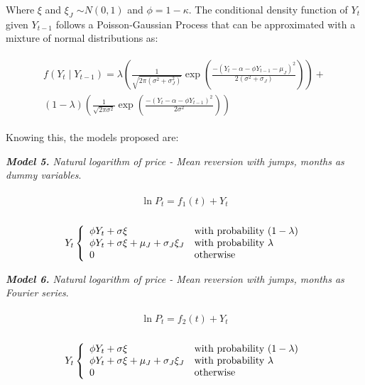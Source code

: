 \documentclass[3p]{elsarticle}
\begin{document}
Where $\xi$ and $\xi_J$ $\sim N(0,1)$ and $\phi=1-\kappa$. The conditional density function of $Y_t$ given $Y_{t-1}$ follows a Poisson-Gaussian Process that can be approximated \citep{Escribano2011} with a mixture of normal distributions as:

\begin{align}
\label{eq:like}
\begin{split}
f(Y_t\mid Y_{t-1})=\lambda\left ( \frac{1}{\sqrt{2\pi( \sigma^2+\sigma_J^2)}} \exp\left ( \frac{-(Y_t-\alpha-\phi Y_{t-1}-\mu_J)^2}{2(\sigma^2+\sigma_J)} \right )\right )+\\
(1-\lambda)\left ( \frac{1}{\sqrt{2\pi\sigma^2}} \exp\left ( \frac{-(Y_t-\alpha-\phi Y_{t-1})^2}{2\sigma^2} \right )\right )
\end{split}
\end{align}

Knowing this, the models proposed are:

\textit{\textbf{Model 5.} Natural logarithm of price - Mean reversion with jumps, months as dummy variables}.

\begin{align}
\label{eq:m4}
\begin{split}
\ln P_t=f_1(t)+Y_t\\
\end{split}
\end{align}

\[Y_t\left\{
\begin{array}{ll}
    \phi Y_t+\sigma\xi & \textup{with probability } (1-\lambda) \\
      \phi Y_t+\sigma\xi+\mu_J+\sigma_J\xi_J & \textup{with probability } \lambda \\
      0 & \textup{otherwise} \\
\end{array} 
\right. \]


\textit{\textbf{Model 6.} Natural logarithm of price - Mean reversion with jumps, months as Fourier series}.

\begin{align}
\label{eq:m4}
\begin{split}
\ln P_t=f_2(t)+Y_t\\
\end{split}
\end{align}

\[Y_t\left\{
\begin{array}{ll}
    \phi Y_t+\sigma\xi & \textup{with probability } (1-\lambda) \\
      \phi Y_t+\sigma\xi+\mu_J+\sigma_J\xi_J & \textup{with probability } \lambda \\
      0 & \textup{otherwise} \\
\end{array} 
\right. \]
\end{document}

